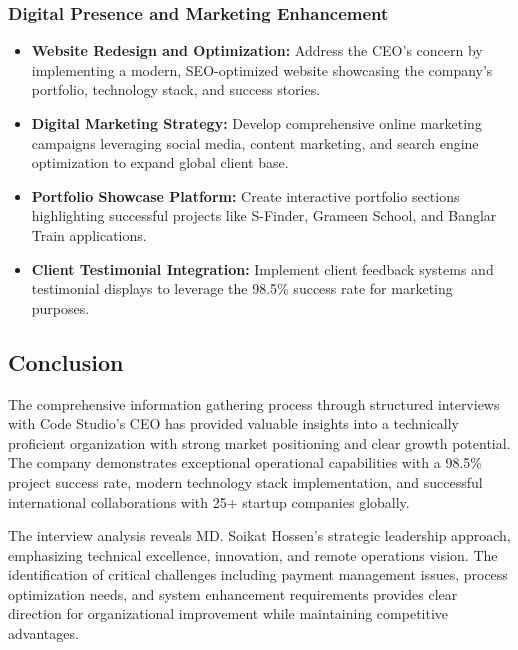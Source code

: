 \documentclass[12pt,a4paper]{article}
\begin{document}
\subsubsection{Digital Presence and Marketing Enhancement}

\begin{itemize}
    \item \textbf{Website Redesign and Optimization:} Address the CEO's concern by implementing a modern, SEO-optimized website showcasing the company's portfolio, technology stack, and success stories.
    
    \item \textbf{Digital Marketing Strategy:} Develop comprehensive online marketing campaigns leveraging social media, content marketing, and search engine optimization to expand global client base.
    
    \item \textbf{Portfolio Showcase Platform:} Create interactive portfolio sections highlighting successful projects like S-Finder, Grameen School, and Banglar Train applications.
    
    \item \textbf{Client Testimonial Integration:} Implement client feedback systems and testimonial displays to leverage the 98.5\% success rate for marketing purposes.
\end{itemize}

\subsection{Conclusion}

The comprehensive information gathering process through structured interviews with Code Studio's CEO has provided valuable insights into a technically proficient organization with strong market positioning and clear growth potential. The company demonstrates exceptional operational capabilities with a 98.5\% project success rate, modern technology stack implementation, and successful international collaborations with 25+ startup companies globally.

The interview analysis reveals MD. Soikat Hossen's strategic leadership approach, emphasizing technical excellence, innovation, and remote operations vision. The identification of critical challenges including payment management issues, process optimization needs, and system enhancement requirements provides clear direction for organizational improvement while maintaining competitive advantages.
\end{document}
